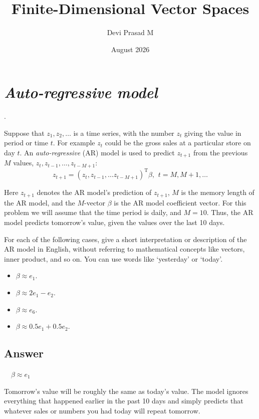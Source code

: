 \documentclass[12pt]{article}
\title{Finite-Dimensional Vector Spaces}
\author{Devi Prasad M}
\date{August 2026}
\newcommand{\vsp}{\vspace*{1em}}
\newcommand{\snl}{\vspace*{2pt}}
\begin{document}
\maketitle

\section{\emph{Auto-regressive model}}.

Suppose that $z_1,z_2,\ldots$ is a time series, with the number $z_t$ giving
the value in period or time $t$. For example $z_t$ could be the gross sales
at a particular store on day $t$. An \emph{auto-regressive} (AR) model is used to
predict $z_{t+1}$ from the previous
$M$ values, $z_t,z_{t-1},\ldots,z_{t-M+1}$:
\[
    z_{t+1} = (z_t,z_{t-1},\ldots z_{t-M+1})^{\textrm{T}} \beta, \ \, t= M,M + 1,\ldots
\]

Here $z_{t+1}$ denotes the AR model's prediction of $z_{t+1}$, $M$ is the
memory length of the AR model, and the $M$-vector $\beta$ is the AR model
coefficient vector. For this problem we will assume that the time period
is daily, and $M = 10$. Thus, the AR model predicts tomorrow's value,
given the values over the last 10 days.

For each of the following cases, give a short interpretation or description of the AR model
in English, without referring to mathematical concepts like vectors, inner product, and
so on. You can use words like `yesterday' or `today'.

\begin{itemize}
    \item [(a)] $\beta \approx e_1$.
    \item [(b)] $\beta \approx 2e_1 - e_2$.
    \item [(c)] $\beta \approx e_6$.
    \item [(d)] $\beta \approx 0.5 e_1 + 0.5 e_2$.
\end{itemize}

\subsection{Answer}
{ \ \ $\beta \approx e_1$}\snl

Tomorrow's value will be roughly the same as today's value.
The model ignores everything that happened earlier in the past 10 days
and simply predicts that whatever sales or numbers you had today will
repeat tomorrow.

\vsp
\end{document}
